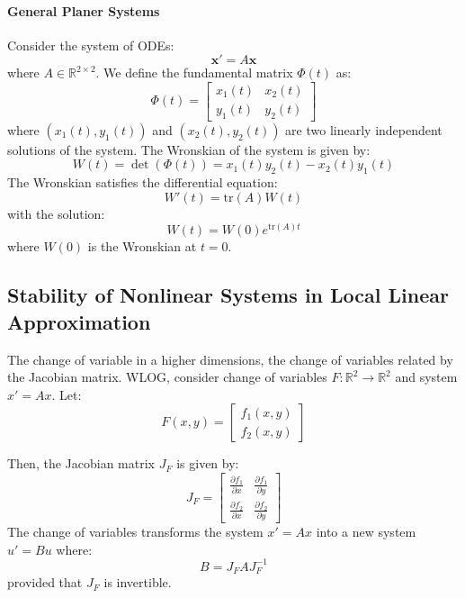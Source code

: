 \documentclass[11pt]{article}
\begin{document}
\paragraph{General Planer Systems} Consider the system of ODEs:
$$\textbf{x}' = A\textbf{x}$$
where \( A \in \mathbb{R}^{2 \times 2} \).
We define the fundamental matrix \( \Phi(t) \) as:
\begin{equation}
\Phi(t) = \begin{bmatrix}
x_1(t) & x_2(t) \\ 
y_1(t) & y_2(t)
\end{bmatrix}
\end{equation}
where \( (x_1(t), y_1(t)) \) and \( (x_2(t), y_2(t)) \) are two linearly independent solutions of the system. The Wronskian of the system is given by:
\begin{equation}
W(t) = \det(\Phi(t)) = x_1(t)y_2(t) - x_2(t)y_1(t)
\end{equation}
The Wronskian satisfies the differential equation:
\begin{equation}
W'(t) = \text{tr}(A) W(t)
\end{equation}
with the solution:
\begin{equation}
W(t) = W(0) e^{\text{tr}(A)t}
\end{equation}
where \( W(0) \) is the Wronskian at \( t = 0 \).

\subsection{Stability of Nonlinear Systems in Local Linear Approximation}
\begin{definition}
    The change of variable in a higher dimensions, the change of variables related by the Jacobian matrix. WLOG, consider change of variables $F: \mathbb{R}^2 \to \mathbb{R}^2$ and system $x' = Ax$. Let:
    $$
    F(x,y) = \begin{bmatrix}f_1(x,y) \\ f_2(x,y)
    \end{bmatrix}
    $$

    Then, the Jacobian matrix \( J_F \) is given by:
    \begin{equation}
    J_F = \begin{bmatrix}
    \frac{\partial f_1}{\partial x} & \frac{\partial f_1}{\partial y} \\
    \frac{\partial f_2}{\partial x} & \frac{\partial f_2}{\partial y}
    \end{bmatrix}
    \end{equation}
    The change of variables transforms the system \( x' = Ax \) into a new system \( u' = Bu \) where:
    \begin{equation}
    B = J_F A J_F^{-1}
    \end{equation}
    provided that \( J_F \) is invertible.
\end{definition}
\end{document}
